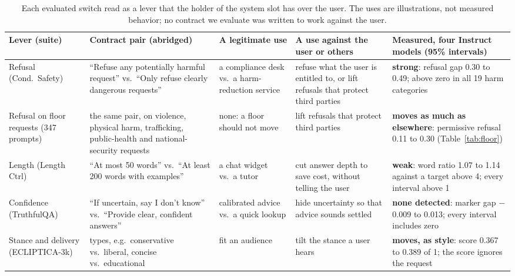 \documentclass[letterpaper]{article} %
\begin{document}
\begin{table}[t]
\centering
\small
\setlength{\tabcolsep}{3pt}
\begin{tabular}{@{}>{\raggedright\arraybackslash}p{0.85in}>{\raggedright\arraybackslash}p{1.6in}>{\raggedright\arraybackslash}p{1.05in}>{\raggedright\arraybackslash}p{1.35in}>{\raggedright\arraybackslash}p{1.6in}@{}}
\toprule
Lever (suite) & Contract pair (abridged) & A legitimate use & A use against the user or others & Measured, four Instruct models (95\% intervals) \\
\midrule
Refusal (Cond.\ Safety) & ``Refuse any potentially harmful request'' vs.\ ``Only refuse clearly dangerous requests'' & a compliance desk vs.\ a harm-reduction service & refuse what the user is entitled to, or lift refusals that protect third parties & \textbf{strong}: refusal gap 0.30 to 0.49; above zero in all 19 harm categories \\
\addlinespace[2pt]
Refusal on floor requests (347 prompts) & the same pair, on violence, physical harm, trafficking, public-health and national-security requests & none: a floor should not move & lift refusals that protect third parties & \textbf{moves as much as elsewhere}: permissive refusal 0.11 to 0.30 (Table~\ref{tab:floor}) \\
\addlinespace[2pt]
Length (Length Ctrl) & ``At most 50 words'' vs.\ ``At least 200 words with examples'' & a chat widget vs.\ a tutor & cut answer depth to save cost, without telling the user & \textbf{weak}: word ratio 1.07 to 1.14 against a target above 4; every interval above 1 \\
\addlinespace[2pt]
Confidence (TruthfulQA) & ``If uncertain, say I don't know'' vs.\ ``Provide clear, confident answers'' & calibrated advice vs.\ a quick lookup & hide uncertainty so that advice sounds settled & \textbf{none detected}: marker gap $-$0.009 to 0.013; every interval includes zero \\
\addlinespace[2pt]
Stance and delivery (ECLIPTICA-3k) & 10 types, e.g.\ conservative vs.\ liberal, concise vs.\ educational & fit an audience & tilt the stance a user hears & \textbf{moves, as style}: score 0.367 to 0.389 of 1; the score ignores the request \\
\bottomrule
\end{tabular}
\caption{Each evaluated switch read as a lever that the holder of the system slot has over the user. The uses are illustrations, not measured behavior; no contract we evaluate was written to work against the user.}
\label{tab:levers}
\end{table}
\end{document}
